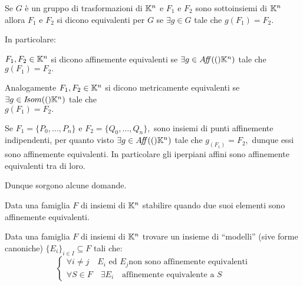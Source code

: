 \documentclass[a4paper,12pt]{article}
\newcommand{\Got}[1]{#1}
\newcommand{\got}[1]{{#1}}
\begin{document}
 \begin{definition}
 \Got{Se} $\got{G}$ \Got{è un gruppo di trasformazioni di} $\got{\K^n}$ \Got{e} $\got{F_1}$ \Got{e} $\got{F_2}$
 \Got{sono sottoinsiemi di} $\got{\K^n}$ \Got{allora} $\got{F_1}$ \Got{e} $\got{F_2}$ \Got{si dicono equivalenti per} $\got{G}$ \Got{se}
 $\got{\exists g\in G}$ \Got{tale che} $\got{g(F_1)=F_2.}$
 \end{definition}
 
 \Got{In particolare:}
 
 \begin{definition}
 \Got{}$\got{F_1,F_2\in \K^n}$ \Got{si dicono affinemente equivalenti se} $\got{\exists g\in \Aff(\K^n)}$ \Got{tale che}\\
 $\got{g(F_1)=F_2.}$
 \end{definition}
 
 \Got{Analogamente} $\got{F_1,F_2\in \K^n}$ \Got{si dicono metricamente equivalenti se} $\got{\exists g\in \Isom(\K^n)}$ \Got{tale che}\\
 $\got{g(F_1)=F_2.}$
 
 \begin{esempio}
 \Got{Se} $\got{F_1=\{P_0,\ldots,P_n\}}$ \Got{e} $\got{F_2=\{Q_0,\ldots,Q_n\},}$ \Got{sono insiemi di punti affinemente
 indipendenti, per quanto visto} $\got{\exists g\in \Aff(\K^n)}$ \Got{tale che} $\got{g_(F_1)=F_2,}$ \Got{dunque essi sono affinemente
 equivalenti. In particolare gli iperpiani affini sono affinemente equivalenti tra di loro.}
 \end{esempio}
 
 \Got{Dunque sorgono alcune domande.}
 
 \begin{problemaI}
  \Got{Data una famiglia} $\got{F}$ \Got{di insiemi di} $\got{\K^n}$ \Got{stabilire quando due suoi elementi sono affinemente
 equivalenti.}
 \end{problemaI}
 
 \begin{problemaI}\Got{Data una famiglia} $\got{F}$ \Got{di insiemi di} $\got{\K^n}$ \Got{trovare un insieme di ``modelli'' (sive forme
 canoniche)} $\got{\{E_i\}_{i\in I}\subseteq F}$ \Got{tali che:}
 \[
	\left\{
		\begin{array}{l}
			\got{\forall i\ne j\quad E_i}\text{ ed } E_j\text{non sono affinemente equivalenti}\\
			\got{\forall S\in F\quad\exists E_i}\quad \text{affinemente equivalente a } S
		\end{array}
	\right.
 \]
 \end{problemaI}
 
\end{document}
